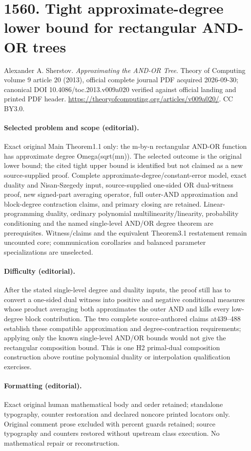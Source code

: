 \documentclass[10pt]{article}
\theoremstyle{definition}
\numberwithin{equation}{section}
\newcommand{\1}{\mathbf{1}}
\begin{document}
\begingroup\raggedright
\section*{1560. Tight approximate-degree lower bound for rectangular AND-OR trees}
Alexander A. Sherstov. \emph{Approximating the AND-OR Tree}. Theory of Computing volume 9 article 20 (2013), official complete journal PDF acquired 2026-09-30; canonical DOI 10.4086/toc.2013.v009a020 verified against official landing and printed PDF header. \url{https://theoryofcomputing.org/articles/v009a020/}. CC BY3.0.
\paragraph{Selected problem and scope (editorial).} Exact original Main Theorem1.1 only: the m-by-n rectangular AND-OR function has approximate degree Omega(sqrt(mn)). The selected outcome is the original lower bound; the cited tight upper bound is identified but not claimed as a new source-supplied proof. Complete approximate-degree/constant-error model, exact duality and Nisan-Szegedy input, source-supplied one-sided OR dual-witness proof, new signed-part averaging operator, full outer-AND approximation and block-degree contraction claims, and primary closing are retained. Linear-programming duality, ordinary polynomial multilinearity/linearity, probability conditioning and the named single-level AND/OR degree theorem are prerequisites. Witness/claims and the equivalent Theorem3.1 restatement remain uncounted core; communication corollaries and balanced parameter specializations are unselected.
\paragraph{Difficulty (editorial).} After the stated single-level degree and duality inputs, the proof still has to convert a one-sided dual witness into positive and negative conditional measures whose product averaging both approximates the outer AND and kills every low-degree block contribution. The two complete source-authored claims at439–488 establish these compatible approximation and degree-contraction requirements; applying only the known single-level AND/OR bounds would not give the rectangular composition bound. This is one H2 primal-dual composition construction above routine polynomial duality or interpolation qualification exercises.
\paragraph{Formatting (editorial).} Exact original human mathematical body and order retained; standalone typography, counter restoration and declared noncore printed locators only. Original comment prose excluded with percent guards retained; source typography and counters restored without upstream class execution. No mathematical repair or reconstruction.
\end{document}
